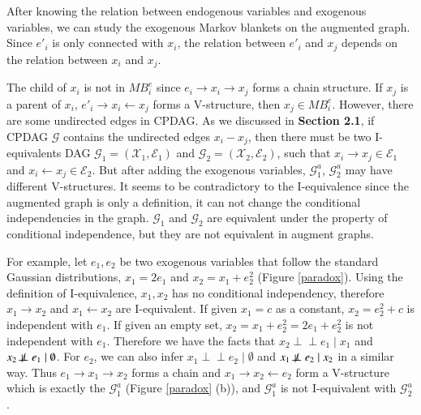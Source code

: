 \documentclass[twoside,11pt]{article}
\begin{document}
After knowing the relation between endogenous variables and exogenous variables, we can study the exogenous Markov blankets on the augmented graph. Since $e'_i$ is only connected with $x_i$, the relation between $e'_i$ and $x_j$ depends on the relation between $x_i$ and $x_j$. 

The child of $x_i$ is not in $MB^e_i$ since $e_i\to x_i\to x_j$ forms a chain structure. If $x_j$ is a parent of $x_i$, $e'_i\to x_i\gets x_j$ forms a V-structure, then $x_j\in MB^e_i$. However, there are some undirected edges in CPDAG. As we discussed in \textbf{Section 2.1}, if CPDAG $\mathcal G$ contains the undirected edges $x_i-x_j$, then there must be two I-equivalents DAG $\mathcal G_1=(\mathcal X_1, \mathcal E_1)$ and $\mathcal G_2=(\mathcal X_2, \mathcal E_2)$, such that $x_i\to x_j\in\mathcal E_1$ and $x_i\gets x_j\in\mathcal E_2$. But after adding the exogenous variables, $\mathcal G^a_1$, $\mathcal G^a_2$ may have different V-structures. It seems to be contradictory to the I-equivalence since the augmented graph is only a definition, it can not change the conditional independencies in the graph. $\mathcal G_1$ and $\mathcal G_2$ are equivalent under the property of conditional independence, but they are not equivalent in augment graphs.

For example, let $e_1, e_2$ be two exogenous variables that follow the standard Gaussian distributions, $x_1=2e_1$ and $x_2=x_1+e_2^2$ (Figure \ref{paradox}). Using the definition of I-equivalence, $x_1, x_2$ has no conditional independency, therefore $x_1\to x_2$ and $x_1\gets x_2$ are I-equivalent. If given $x_1=c$ as a constant, $x_2=e^2_2+c$ is independent with $e_1$. If given an empty set,  $x_2=x_1+e^2_2=2e_1+e^2_2$ is not independent with $e_1$. Therefore we have the facts that $x_2\perp\!\!\!\perp e_1\mid x_1$ and $x_2\not\!\perp\!\!\!\perp e_1\mid\emptyset$. For $e_2$, we can also infer $x_1\perp\!\!\!\perp e_2\mid\emptyset$ and $x_1\not\!\perp\!\!\!\perp e_2\mid x_2$ in a similar way. Thus $e_1\to x_1\to x_2$ forms a chain and $x_1\to x_2\gets e_2$ form a V-structure which is exactly the $\mathcal G^a_1$ (Figure \ref{paradox} (b)), and $\mathcal G^a_1$ is not I-equivalent with $\mathcal G^a_2$.
\end{document}
